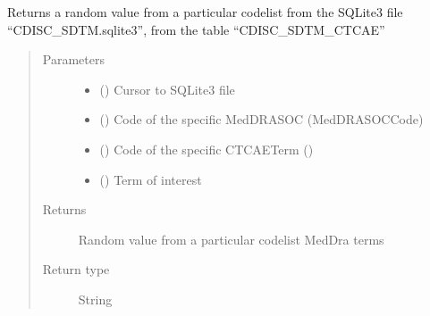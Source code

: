 \documentclass[letterpaper,10pt,english]{sphinxmanual}
\begin{document}

\begin{fulllineitems}
\label{\detokenize{CE_app:CE_app.nihpo_functions.func_nihpo_synth_data_random_value_CTCAE}}
\sphinxAtStartPar
Returns a random value from a particular codelist from the SQLite3 file “CDISC\_SDTM.sqlite3”, from the table “CDISC\_SDTM\_CTCAE”
\begin{quote}\begin{description}
\item[{Parameters}] \leavevmode\begin{itemize}
\item {} 
\sphinxAtStartPar
{} () \textendash{} Cursor to SQLite3 file

\item {} 
\sphinxAtStartPar
{} () \textendash{} Code of the specific MedDRASOC (MedDRASOCCode)

\item {} 
\sphinxAtStartPar
{} () \textendash{} Code of the specific CTCAETerm ()

\item {} 
\sphinxAtStartPar
{} () \textendash{} Term of interest

\end{itemize}

\item[{Returns}] \leavevmode
\sphinxAtStartPar
Random value from a particular codelist MedDra terms

\item[{Return type}] \leavevmode
\sphinxAtStartPar
String

\end{description}\end{quote}

\end{fulllineitems}
\end{document}

